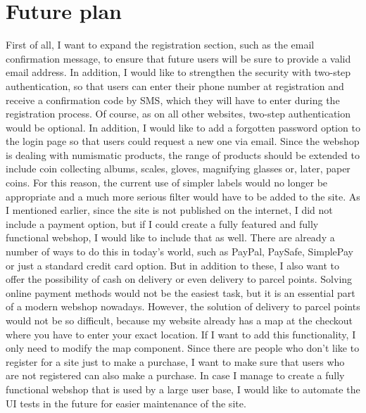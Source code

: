 \section{Future plan}
First of all, I want to expand the registration section, such as the email confirmation message, to ensure that future users will be sure to provide a valid email address. In addition, I would like to strengthen the security with two-step authentication, so that users can enter their phone number at registration and receive a confirmation code by SMS, which they will have to enter during the registration process. Of course, as on all other websites, two-step authentication would be optional. In addition, I would like to add a forgotten password option to the login page so that users could request a new one via email. Since the webshop is dealing with numismatic products, the range of products should be extended to include coin collecting albums, scales, gloves, magnifying glasses or, later, paper coins. For this reason, the current use of simpler labels would no longer be appropriate and a much more serious filter would have to be added to the site. As I mentioned earlier, since the site is not published on the internet, I did not include a payment option, but if I could create a fully featured and fully functional webshop, I would like to include that as well. There are already a number of ways to do this in today's world, such as PayPal, PaySafe, SimplePay or just a standard credit card option. But in addition to these, I also want to offer the possibility of cash on delivery or even delivery to parcel points. Solving online payment methods would not be the easiest task, but it is an essential part of a modern webshop nowadays. However, the solution of delivery to parcel points would not be so difficult, because my website already has a map at the checkout where you have to enter your exact location. If I want to add this functionality, I only need to modify the map component. Since there are people who don't like to register for a site just to make a purchase, I want to make sure that users who are not registered can also make a purchase. In case I manage to create a fully functional webshop that is used by a large user base, I would like to automate the UI tests in the future for easier maintenance of the site.